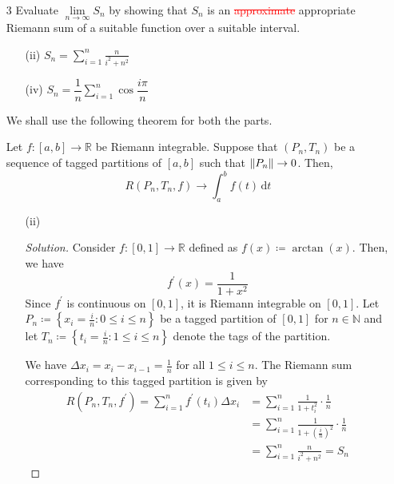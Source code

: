 \documentclass[12pt]{article}
\def\D{\mathrm{d}}
\def\ddfrac#1#2{\displaystyle\frac{\displaystyle #1}{\displaystyle #2}}
\theoremstyle{definition}
\newenvironment{soln}{\begin{proof}[Solution]}{\end{proof}}
\begin{document}
\begin{enumerate}[leftmargin=*]
    \newpage


    \item[3] Evaluate $\lim\limits_{n \to \infty} S_n$ by showing that $S_n$ is an \textcolor{red}{\sout{approximate}} appropriate Riemann sum of a suitable function over a suitable interval.
    
        \begin{multicols}{2}
    \begin{enumerate}[leftmargin=*]
        \item[(ii)] $S_n = \sum\limits_{i=1}^{n} \ddfrac{n}{i^2 + n^2}$
        \item[(iv)] $S_n = \dfrac{1}{n} \sum\limits_{i=1}^n \cos \dfrac{i\pi}{n}$
    \end{enumerate}
    \end{multicols}
    
    We shall use the following theorem for both the parts. 
    
    \begin{thm*}
        Let $f \colon [a,b] \to \mathbb{R}$ be Riemann integrable. Suppose that $(P_n, T_n)$ be a sequence of tagged partitions of $[a,b]$ such that $\norm{P_n} \to 0$. Then, 
        \[
            R(P_n, T_n, f) \to \int_a^b f(t) \, \D t
        \]
    \end{thm*}
    
    \begin{enumerate}[leftmargin=*]
    \item[(ii)]
    \begin{soln}
        Consider $f \colon [0,1] \rightarrow \mathbb{R}$ defined as $f(x) \coloneqq \arctan(x)$. Then, we have
        \[
            f^{\prime}(x) = \frac{1}{1+x^2}
        \]
        Since $f^{\prime}$ is continuous on $[0,1]$, it is Riemann integrable on $[0,1]$. Let $P_n \coloneqq \left\{ x_i = \frac{i}{n} \colon 0 \leq i \leq n \right\}$ be a tagged partition of $[0,1]$ for $n \in \mathbb{N}$ and let $T_n \coloneqq \left\{ t_i = \frac{i}{n} \colon 1 \leq i \leq n\right\}$ denote the tags of the partition. 
        
        \medskip
        
        We have $\Delta x_i = x_{i} - x_{i-1} = \frac{1}{n}$ for all $1 \leq i \leq n$. The Riemann sum corresponding to this tagged partition is given by 
        \begin{align*}
            R(P_n, T_n, f^{\prime}) = \sum_{i=1}^{n} f^{\prime}(t_i) \Delta x_i &= \sum_{i=1}^n \frac{1}{1+t_i^2} \cdot \frac{1}{n} \\
            &= \sum_{i=1}^n \frac{1}{1 + \left(\frac{i}{n} \right)^2 } \cdot \frac{1}{n} \\
            &= \sum_{i=1}^n \frac{n}{i^2 + n^2} = S_n
        \end{align*}
        

\end{soln}
\end{enumerate}
\end{enumerate}
\end{document}
